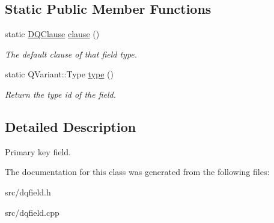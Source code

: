 \subsection*{Static Public Member Functions}
\begin{DoxyCompactItemize}
\item 
\hypertarget{classDQPrimaryKey_ac053b55ec117e7451e342402cab6eb2c}{
static \hyperlink{classDQClause}{DQClause} \hyperlink{classDQPrimaryKey_ac053b55ec117e7451e342402cab6eb2c}{clause} ()}
\label{classDQPrimaryKey_ac053b55ec117e7451e342402cab6eb2c}

\begin{DoxyCompactList}\small\item\em The default clause of that field type. \item\end{DoxyCompactList}\item 
\hypertarget{classDQField_a0e5a0f071bf01560f4c47d233ca726e9}{
static QVariant::Type \hyperlink{classDQField_a0e5a0f071bf01560f4c47d233ca726e9}{type} ()}
\label{classDQField_a0e5a0f071bf01560f4c47d233ca726e9}

\begin{DoxyCompactList}\small\item\em Return the type id of the field. \item\end{DoxyCompactList}\end{DoxyCompactItemize}


\subsection{Detailed Description}
Primary key field. 

The documentation for this class was generated from the following files:\begin{DoxyCompactItemize}
\item 
src/dqfield.h\item 
src/dqfield.cpp\end{DoxyCompactItemize}
